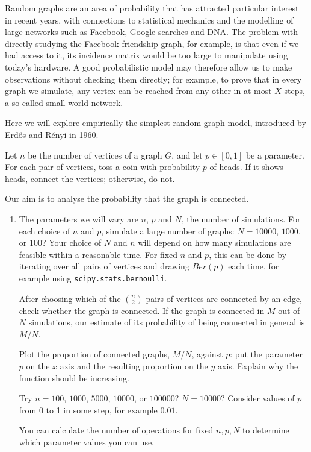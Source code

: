 \documentclass[a4paper]{report}
\begin{document}
\begin{problem}
Random graphs are an area of probability that has attracted particular interest in recent years, with connections to statistical mechanics and the modelling of large networks such as Facebook, Google searches and DNA. The problem with directly studying the Facebook friendship graph, for example, is that even if we had access to it, its incidence matrix would be too large to manipulate using today's hardware. A good probabilistic model may therefore allow us to make observations without checking them directly; for example, to prove that in every graph we simulate, any vertex can be reached from any other in at most $X$ steps, a so-called small-world network.

Here we will explore empirically the simplest random graph model, introduced by Erd\H{o}s and R\'enyi in 1960.

Let $n$ be the number of vertices of a graph $G$, and let $p\in[0,1]$ be a parameter. For each pair of vertices, toss a coin with probability $p$ of heads. If it shows heads, connect the vertices; otherwise, do not.

Our aim is to analyse the probability that the graph is connected.
\begin{enumerate}
\item The parameters we will vary are $n$, $p$ and $N$, the number of simulations. For each choice of $n$ and $p$, simulate a large number of graphs: $N=10000$, $1000$, or $100$? Your choice of $N$ and $n$ will depend on how many simulations are feasible within a reasonable time. For fixed $n$ and $p$, this can be done by iterating over all pairs of vertices and drawing $Ber(p)$ each time, for example using \texttt{scipy.stats.bernoulli}.

After choosing which of the $\binom n2$ pairs of vertices are connected by an edge, check whether the graph is connected. If the graph is connected in $M$ out of $N$ simulations, our estimate of its probability of being connected in general is $M/N$.

Plot the proportion of connected graphs, $M/N$, against $p$: put the parameter $p$ on the $x$ axis and the resulting proportion on the $y$ axis. Explain why the function should be increasing.

Try $n=100$, $1000$, $5000$, $10000$, or $100000$? $N=10000$? Consider values of $p$ from 0 to 1 in some step, for example $0.01$.

You can calculate the number of operations for fixed $n,p,N$ to determine which parameter values you can use.


\end{enumerate}
\end{problem}
\end{document}
